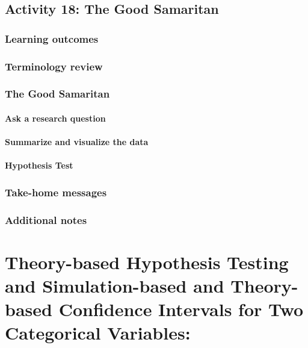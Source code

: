 \documentclass[
]{report}
\begin{document}
\section{Activity 18: The Good Samaritan}\label{activity-18-the-good-samaritan}

\subsection{Learning outcomes}\label{learning-outcomes-19}

\subsection{Terminology review}\label{terminology-review-16}

\subsection{The Good Samaritan}\label{the-good-samaritan}

\subsubsection*{Ask a research question}\label{ask-a-research-question-3}

\subsubsection*{Summarize and visualize the data}\label{summarize-and-visualize-the-data-3}

\subsubsection*{Hypothesis Test}\label{hypothesis-test-1}

\subsection{Take-home messages}\label{take-home-messages-17}

\subsection{Additional notes}\label{additional-notes-17}

\chapter{Theory-based Hypothesis Testing and Simulation-based and Theory-based Confidence Intervals for Two Categorical Variables:}\label{theory-based-hypothesis-testing-and-simulation-based-and-theory-based-confidence-intervals-for-two-categorical-variables}
\end{document}
